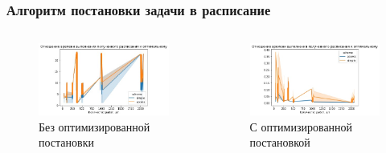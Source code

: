 \begin{frame}
    \frametitle{Алгоритм постановки задачи в расписание}
    \begin{columns}
        \begin{column}{0.5\textwidth}
            \begin{figure}
                \includegraphics[width=\linewidth]{imgs/schedule_time_no_hp.jpg}
                \caption*{Без оптимизированной постановки}
            \end{figure}
        \end{column}
        \begin{column}{0.5\textwidth}
            \begin{figure}
                \includegraphics[width=\linewidth]{imgs/schedule_time_with_hp.jpg}
                \caption*{С оптимизированной постановкой}
            \end{figure}
        \end{column}
    \end{columns}
\end{frame}


